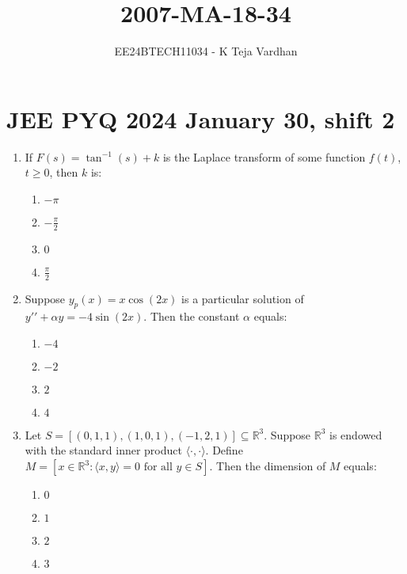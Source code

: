 \documentclass[journal]{IEEEtran}
\newcommand{\brak}[1]{\left( #1 \right)}
\newcommand{\sbrak}[1]{\left[ #1 \right]}
\begin{document}

\title{2007-MA-18-34}
\author{EE24BTECH11034 - K Teja Vardhan}
{\let\newpage\relax\maketitle}

\section{JEE PYQ 2024 January 30, shift 2}
\begin{enumerate}

  \item If $F\brak{s} = \tan^{-1}\brak{s} + k$ is the Laplace transform of some function $f\brak{t}$, $t \geq 0$, then $k$ is:
    
    \begin{multicols}{4}
    \begin{enumerate}
        \item $-\pi$
        \item $-\frac{\pi}{2}$
        \item $0$
        \item $\frac{\pi}{2}$
    \end{enumerate}
    \end{multicols}

  \item Suppose $y_p\brak{x} = x \cos\brak{2x}$ is a particular solution of $y\prime\prime + \alpha y = -4 \sin\brak{2x}$. Then the constant $\alpha$ equals:
    
    \begin{multicols}{4}
    \begin{enumerate}
        \item $-4$
        \item $-2$
        \item $2$
        \item $4$
    \end{enumerate}
    \end{multicols}

  \item Let $S = \sbrak{\brak{0,1,1}, \brak{1,0,1}, \brak{-1,2,1}} \subseteq \mathbb{R}^3$. Suppose $\mathbb{R}^3$ is endowed with the standard inner product $\langle \cdot, \cdot \rangle$. Define $M = \sbrak{x \in \mathbb{R}^3 : \langle x, y \rangle = 0 \text{ for all } y \in S}$. Then the dimension of $M$ equals:

    \begin{multicols}{4}
    \begin{enumerate}
        \item $0$
        \item $1$
        \item $2$
        \item $3$
    \end{enumerate}
    \end{multicols}


\end{enumerate}
\end{document}
